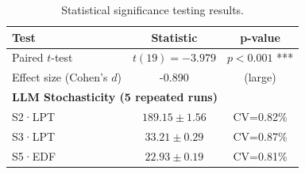 
\begin{table}[h]
\centering
\caption{Statistical significance testing results.}
\label{tab:statistical_tests}
\begin{tabular}{lcc}
\toprule
Test & Statistic & p-value \\
\midrule
Paired $t$-test & $t(19) = -3.979$ & $p < 0.001$ *** \\
Effect size (Cohen's $d$) & -0.890 & (large) \\
\midrule
\multicolumn{3}{l}{\textbf{LLM Stochasticity (5 repeated runs)}} \\
S2·LPT & $189.15 \pm 1.56$ & CV=0.82\% \\
S3·LPT & $33.21 \pm 0.29$ & CV=0.87\% \\
S5·EDF & $22.93 \pm 0.19$ & CV=0.81\% \\
\bottomrule
\end{tabular}
\end{table}
